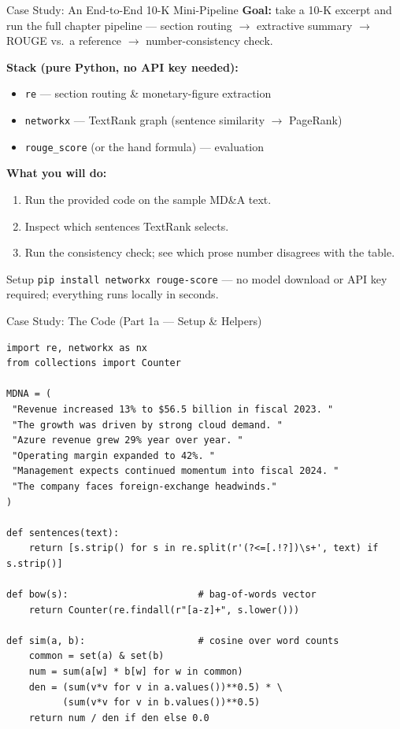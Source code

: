 \documentclass[9pt,t]{beamer}
\begin{document}
\begin{frame}{Case Study: An End-to-End 10-K Mini-Pipeline}
\textbf{Goal:} take a 10-K excerpt and run the full chapter pipeline ---
section routing $\to$ extractive summary $\to$ ROUGE vs.\ a reference $\to$
number-consistency check.

\medskip
\textbf{Stack (pure Python, no API key needed):}
\begin{itemize}
  \item \texttt{re} --- section routing \& monetary-figure extraction
  \item \texttt{networkx} --- TextRank graph (sentence similarity $\to$ PageRank)
  \item \texttt{rouge\_score} (or the hand formula) --- evaluation
\end{itemize}

\medskip
\textbf{What you will do:}
\begin{enumerate}
  \item Run the provided code on the sample MD\&A text.
  \item Inspect which sentences TextRank selects.
  \item Run the consistency check; see which prose number disagrees with the table.
\end{enumerate}

\medskip
\begin{alertblock}{Setup}
\texttt{pip install networkx rouge-score} --- no model download or API key required;
everything runs locally in seconds.
\end{alertblock}
\end{frame}

\begin{frame}[fragile]{Case Study: The Code (Part 1a --- Setup \& Helpers)}
\begin{lstlisting}[basicstyle=\ttfamily\scriptsize]
import re, networkx as nx
from collections import Counter

MDNA = (
 "Revenue increased 13% to $56.5 billion in fiscal 2023. "
 "The growth was driven by strong cloud demand. "
 "Azure revenue grew 29% year over year. "
 "Operating margin expanded to 42%. "
 "Management expects continued momentum into fiscal 2024. "
 "The company faces foreign-exchange headwinds."
)

def sentences(text):
    return [s.strip() for s in re.split(r'(?<=[.!?])\s+', text) if s.strip()]

def bow(s):                       # bag-of-words vector
    return Counter(re.findall(r"[a-z]+", s.lower()))

def sim(a, b):                    # cosine over word counts
    common = set(a) & set(b)
    num = sum(a[w] * b[w] for w in common)
    den = (sum(v*v for v in a.values())**0.5) * \
          (sum(v*v for v in b.values())**0.5)
    return num / den if den else 0.0
\end{lstlisting}
\end{frame}
\end{document}
